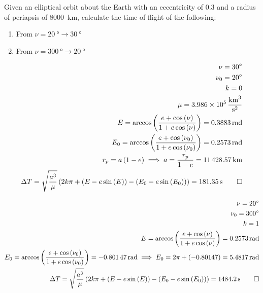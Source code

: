 \begin{hwkProblem}{8}{}

	Given an elliptical orbit about the Earth with an eccentricity of \( 0.3 \) and a radius of periapsis of \qty{8000}{\km}, calculate the time of flight of the following:
	\begin{enumerate}
		\item From \( \nu = \qty{20}{\degree} \to \qty{30}{\degree} \)
		\item From \( \nu = \qty{300}{\degree} \to \qty{20}{\degree} \)
	\end{enumerate}

	\hwkSol

	\hwkPart

	\begin{align*}
		\nu = \qty{30}{\degree} \\
		\nu_{0} = \qty{20}{\degree} \\
		k = 0 \\
		\mu = \qty{3.986e5}{\cubic\km\per\square\s} \\
		E = \arccos{\left(\frac{e+\cos{\left(\nu\right)}}{1+e\cos{\left(\nu\right)}}\right)} = \qty{0.3883}{\radian} \\
		E_{0} = \arccos{\left(\frac{e+\cos{\left(\nu _{0}\right)}}{1+e\cos{\left(\nu_{0}\right)}}\right)} = \qty{0.2573}{\radian} \\
		r_{p} = a \left(1 - e\right) \implies a = \frac{r_{p}}{1-e} = \qty{11428.57}{\km} \\
		\Delta T = \sqrt{\frac{a^{3}}{\mu}} \left(2k\pi+\left(E-e\sin{\left(E\right)}\right) - \left(E_{0} - e \sin{\left(E_{0}\right)}\right)\right) = \qty{181.35}{\s} \qed
	\end{align*}

	\hwkPart

	\begin{align*}
		\nu = \qty{20}{\degree} \\
		\nu_{0} = \qty{300}{\degree} \\
		k = 1 \\
		E = \arccos{\left( \frac{e+\cos{\left(\nu\right)}}{1+e\cos{\left(\nu\right)}} \right)} = \qty{0.2573}{\radian} \\
		E_{0} = \arccos{\left(\frac{e+\cos{\left(\nu_{0}\right)}}{1+e\cos{\left(\nu_{0}\right)}}\right)} = \qty{-0.80147}{\radian} \implies E_{0} = 2\pi+\left(-0.80147\right) = \qty{5.4817}{\radian} \\
		\Delta T = \sqrt{\frac{a^{3}}{\mu}} \left(2k\pi+\left(E-e\sin{\left(E\right)}\right) - \left(E_{0} - e \sin{\left(E_{0}\right)}\right)\right) = \qty{1484.2}{\s} \qed
	\end{align*}

\end{hwkProblem}

